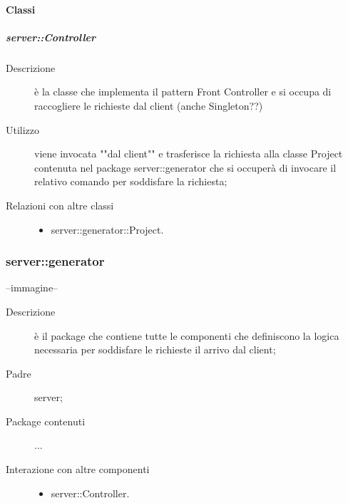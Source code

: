 \paragraph{Classi}
\subparagraph{server::Controller}
\begin{description}
\item[Descrizione] è la classe che implementa il pattern Front Controller e si occupa di raccogliere le richieste dal client (anche Singleton??)
\item[Utilizzo] viene invocata ""dal client"" e trasferisce la richiesta alla classe Project contenuta nel package server::generator che si occuperà di invocare il relativo comando per soddisfare la richiesta; 
\item[Relazioni con altre classi] 
	\begin{itemize}
	\item server::generator::Project.
	\end{itemize}
\end{description}

\subsubsection{server::generator}
--immagine--
\begin{description}
\item[Descrizione] è il package che contiene tutte le componenti che definiscono la logica necessaria per soddisfare le richieste il arrivo dal client;
\item[Padre] server; 
\item[Package contenuti]
	\begin{itemize}
	...
	\end{itemize}
\item[Interazione con altre componenti] 
	\begin{itemize}
	\item server::Controller.
	\end{itemize}
\end{description}
